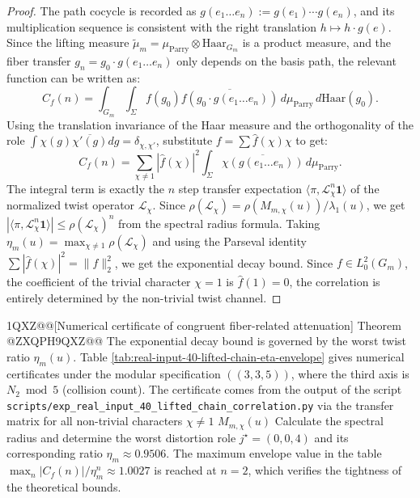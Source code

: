{\begin{proof}
The path cocycle is recorded as $g(e_1 \dots e_n) := g(e_1) \cdots g(e_n)$, and its multiplication sequence is consistent with the right translation $h \mapsto h \cdot g(e)$.
Since the lifting measure $\widetilde\mu_m = \mu_{\mathrm{Parry}} \otimes \mathrm{Haar}_{G_m}$ is a product measure, and the fiber transfer $g_n = g_0 \cdot g(e_1 \dots e_n)$ only depends on the basis path, the relevant function can be written as:
\[
C_f(n) = \int_{G_m} \int_{\Sigma} f(g_0) \overline{f(g_0 \cdot g(e_1 \dots e_n))} \, d\mu_{\mathrm{Parry}} \, d\mathrm{Haar}(g_0).
\]
Using the translation invariance of the Haar measure and the orthogonality of the role $\int \chi(g) \overline{\chi'(g)} dg = \delta_{\chi,\chi'}$, substitute $f = \sum \hat{f}(\chi) \chi$ to get:
\[
C_f(n) = \sum_{\chi \neq 1} |\hat{f}(\chi)|^2 \int_{\Sigma} \overline{\chi(g(e_1 \dots e_n))} \, d\mu_{\mathrm{Parry}}.
\]
The integral term is exactly the $n$ step transfer expectation $\langle \pi, \mathcal{L}_\chi^n \mathbf{1} \rangle$ of the normalized twist operator $\mathcal{L}_\chi$.
Since $\rho(\mathcal{L}_\chi) = \rho(M_{m,\chi}(u))/\lambda_1(u)$, we get $|\langle \pi, \mathcal{L}_\chi^n \mathbf{1} \rangle| \le \rho(\mathcal{L}_\chi)^n$ from the spectral radius formula.
Taking $\eta_m(u) = \max_{\chi \neq 1} \rho(\mathcal{L}_\chi)$ and using the Parseval identity $\sum |\hat{f}(\chi)|^2 = \|f\|_2^2$, we get the exponential decay bound.
Since $f \in L^2_0(G_m)$, the coefficient of the trivial character $\chi=1$ is $\hat{f}(1) = 0$, the correlation is entirely determined by the non-trivial twist channel.
\end{proof}

\begin@@ZXQPH1QXZ@@[Numerical certificate of congruent fiber-related attenuation]\label{rem:pom-fiber-corr-decay-certificate}
Theorem @ZXQPH9QXZ@@ The exponential decay bound is governed by the worst twist ratio $\eta_m(u)$. Table \ref{tab:real-input-40-lifted-chain-eta-envelope} gives numerical certificates under the modular specification $((3,3,5))$, where the third axis is $N_2 \bmod 5$ (collision count). The certificate comes from the output of the script \verb|scripts/exp_real_input_40_lifted_chain_correlation.py| via the transfer matrix for all non-trivial characters $\chi \neq 1$ $M_{m,\chi}(u)$ Calculate the spectral radius and determine the worst distortion role $j^\star=(0,0,4)$ and its corresponding ratio $\eta_m \approx 0.9506$. The maximum envelope value in the table $\max_n |C_f(n)|/\eta_m^n \approx 1.0027$ is reached at $n=2$, which verifies the tightness of the theoretical bounds.

}
